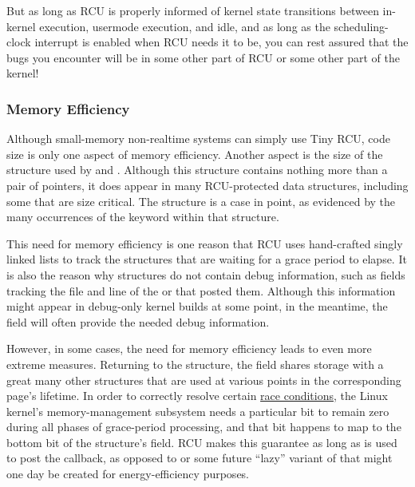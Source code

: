 \QuickQuizEnd

But as long as RCU is properly informed of kernel state transitions
between in-kernel execution, usermode execution, and idle, and as long
as the scheduling-clock interrupt is enabled when RCU needs it to be,
you can rest assured that the bugs you encounter will be in some other
part of RCU or some other part of the kernel!


\subsubsection{Memory Efficiency}

Although small-memory non-realtime systems can simply use Tiny RCU, code
size is only one aspect of memory efficiency.
Another aspect is the size
of the  structure used by  and
.
Although this structure contains nothing more than a
pair of pointers, it does appear in many RCU-protected data structures,
including some that are size critical.
The  structure is a case
in point, as evidenced by the many occurrences of the  keyword
within that structure.

This need for memory efficiency is one reason that RCU uses hand-crafted
singly linked lists to track the  structures that are
waiting for a grace period to elapse.
It is also the reason why
 structures do not contain debug information, such as fields
tracking the file and line of the  or  that
posted them.
Although this information might appear in debug-only kernel
builds at some point, in the meantime, the  field will often
provide the needed debug information.

However, in some cases, the need for memory efficiency leads to even
more extreme measures.
Returning to the  structure, the
 field shares storage with a great many other structures
that are used at various points in the corresponding page's lifetime.
In
order to correctly resolve certain
\href{https://lore.kernel.org/r/1439976106-137226-1-git-send-email-kirill.shutemov@linux.intel.com}{race conditions},
the Linux kernel's memory-management subsystem needs a particular bit to
remain zero during all phases of grace-period processing, and that bit
happens to map to the bottom bit of the  structure's
 field.
RCU makes this guarantee as long as  is
used to post the callback, as opposed to  or some future
``lazy'' variant of  that might one day be created for
energy-efficiency purposes.

